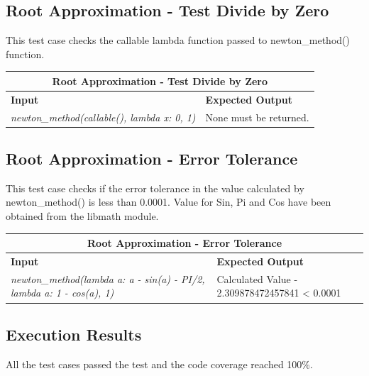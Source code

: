 \subsection{Root Approximation - Test Divide by Zero}
\begin{flushleft}
    This test case checks the callable lambda function passed to newton\_method() function. 
\vspace*{1em}

\begin{tabular}{ |p{6cm}||p{6cm} |  }
    \hline
    \multicolumn{2}{|c|}{\textbf{Root Approximation - Test Divide by Zero}} \\
    \hline
    \textbf{Input} & \textbf{Expected Output}\\
    \hline
    \textit{newton\_method(callable(), lambda x: 0, 1)}   & None must be returned. \\
    \hline
\end{tabular}
\end{flushleft}

\vspace*{1em}
\subsection{Root Approximation - Error Tolerance}
\begin{flushleft}
    This test case checks if the error tolerance in the value calculated by newton\_method() is less than 0.0001. 
    Value for Sin, Pi and Cos have been obtained from the libmath module.
 
\vspace*{1em}

\begin{tabular}{ |p{6cm}||p{6cm} |  }
    \hline
    \multicolumn{2}{|c|}{\textbf{Root Approximation - Error Tolerance}} \\
    \hline
    \textbf{Input} & \textbf{Expected Output}\\
    \hline
    \textit{newton\_method(lambda a: a - sin(a) - PI/2, lambda a: 1 - cos(a), 1)}   & Calculated Value - 2.309878472457841 < 0.0001 \\
    \hline
\end{tabular}
\end{flushleft}
\pagebreak
\subsection{Execution Results}

All the test cases passed the test and the code coverage reached 100\%.


